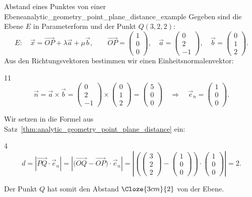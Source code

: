 \begin{ExampleBox}{Abstand eines Punktes von einer Ebene}{analytic_geometry_point_plane_distance_example}
  Gegeben sind die Ebene $E$ in Parameterform und der Punkt $Q(3,2,2)$:
  \[
    E:\quad
    \vec x=\overrightarrow{OP}+\lambda\vec a+\mu\vec b,
    \qquad
    \overrightarrow{OP}=\begin{pmatrix}1\\0\\0\end{pmatrix},
    \quad
    \vec a=\begin{pmatrix}0\\2\\-1\end{pmatrix},
    \quad
    \vec b=\begin{pmatrix}0\\1\\2\end{pmatrix}.
  \]
  Aus den Richtungsvektoren bestimmen wir einen
  Einheitsnormalenvektor:
  \begin{ClozeArea}[34]{11}
    \[
      \vec n
      =\vec a\times\vec b
      =\begin{pmatrix}0\\2\\-1\end{pmatrix}
        \times\begin{pmatrix}0\\1\\2\end{pmatrix}
      =\begin{pmatrix}5\\0\\0\end{pmatrix}
      \quad\Longrightarrow\quad
      \vec e_n=\begin{pmatrix}1\\0\\0\end{pmatrix}.
    \]
  \end{ClozeArea}
  Wir setzen in die Formel aus Satz~\ref{thm:analytic_geometry_point_plane_distance} ein:
  \begin{ClozeArea}[34]{4}
    \[
      d
      =\left\lvert\overrightarrow{PQ}\cdot\vec e_n\right\rvert
      =\left\lvert
        \bigl(\overrightarrow{OQ}-\overrightarrow{OP}\bigr)\cdot\vec e_n
      \right\rvert
      =\left\lvert
        \left(
          \begin{pmatrix}3\\2\\2\end{pmatrix}
          -\begin{pmatrix}1\\0\\0\end{pmatrix}
        \right)\cdot
        \begin{pmatrix}1\\0\\0\end{pmatrix}
      \right\rvert
      =2.
    \]
  \end{ClozeArea}
  Der Punkt $Q$ hat somit den Abstand $\Cloze{3cm}{2}$ von der Ebene.
\end{ExampleBox}

